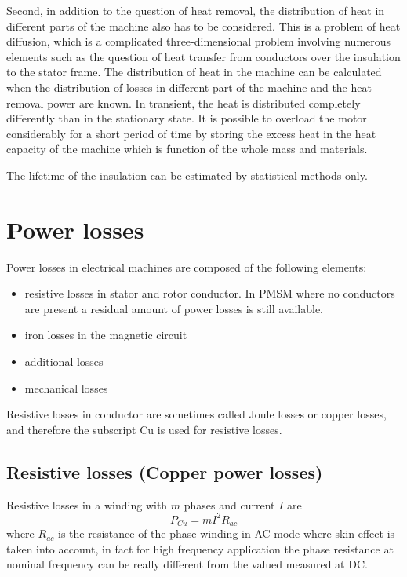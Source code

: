\documentclass[12pt,a4paper,oneside]{book}
\begin{document}
\begin{onehalfspace}
Second, in addition to the question of heat removal, the distribution of heat in different parts of the machine also has to be considered. This is a problem of heat diffusion, which is a complicated three-dimensional problem involving numerous elements such as the question of heat transfer from conductors over the insulation to the stator frame. The distribution of heat in the machine can be calculated when the distribution of losses in different part of the machine and the heat removal power are known. In transient, the heat is distributed completely differently than in the stationary state. It is possible to overload the motor considerably for a short period of time by storing the excess heat in the heat capacity of the machine which is function of the whole mass and materials.

The lifetime of the insulation can be estimated by statistical methods only. 

\section{Power losses}
Power losses in electrical machines are composed of the following elements:
\begin{itemize}
	\item resistive losses in stator and rotor conductor. In PMSM where no conductors are present a residual amount of power losses is still available.
	\item iron losses in the magnetic circuit
	\item additional losses
	\item mechanical losses
\end{itemize}

Resistive losses in conductor are sometimes called Joule losses or copper losses, and therefore the subscript Cu is used for resistive losses.

\subsection{Resistive losses (Copper power losses)}
Resistive losses in a winding with $m$ phases and current $I$ are
\begin{equation}
	P_{Cu}=mI^2R_{ac}
\end{equation}
where $R_{ac}$ is the resistance of the phase winding in AC mode where skin effect is taken into account, in fact for high frequency application the phase resistance at nominal frequency can be really different from the valued measured at DC.


\end{onehalfspace}
\end{document}
